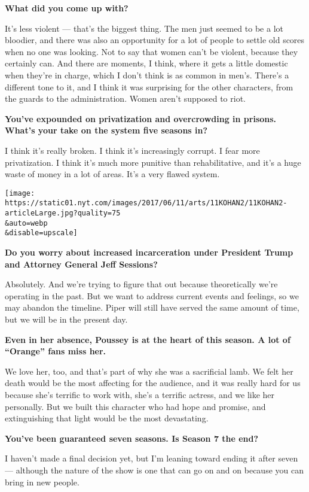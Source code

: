 \textbf{What did you come up with?}

It's less violent --- that's the biggest thing. The men just seemed to
be a lot bloodier, and there was also an opportunity for a lot of people
to settle old scores when no one was looking. Not to say that women
can't be violent, because they certainly can. And there are moments, I
think, where it gets a little domestic when they're in charge, which I
don't think is as common in men's. There's a different tone to it, and I
think it was surprising for the other characters, from the guards to the
administration. Women aren't supposed to riot.

\textbf{You've expounded on privatization and overcrowding in prisons.
What's your take on the system five seasons in?}

I think it's really broken. I think it's increasingly corrupt. I fear
more privatization. I think it's much more punitive than rehabilitative,
and it's a huge waste of money in a lot of areas. It's a very flawed
system.

\texttt{[image: https://static01.nyt.com/images/2017/06/11/arts/11KOHAN2/11KOHAN2-articleLarge.jpg?quality=75\\\&auto=webp\\\&disable=upscale]}

\textbf{Do you worry about increased incarceration under President Trump
and Attorney General Jeff Sessions?}

Absolutely. And we're trying to figure that out because theoretically
we're operating in the past. But we want to address current events and
feelings, so we may abandon the timeline. Piper will still have served
the same amount of time, but we will be in the present day.

\textbf{Even in her absence, Poussey is at the heart of this season. A
lot of ``Orange'' fans miss her.}

We love her, too, and that's part of why she was a sacrificial lamb. We
felt her death would be the most affecting for the audience, and it was
really hard for us because she's terrific to work with, she's a terrific
actress, and we like her personally. But we built this character who had
hope and promise, and extinguishing that light would be the most
devastating.

\textbf{You've been guaranteed seven seasons. Is Season 7 the end?}

I haven't made a final decision yet, but I'm leaning toward ending it
after seven --- although the nature of the show is one that can go on
and on because you can bring in new people.

